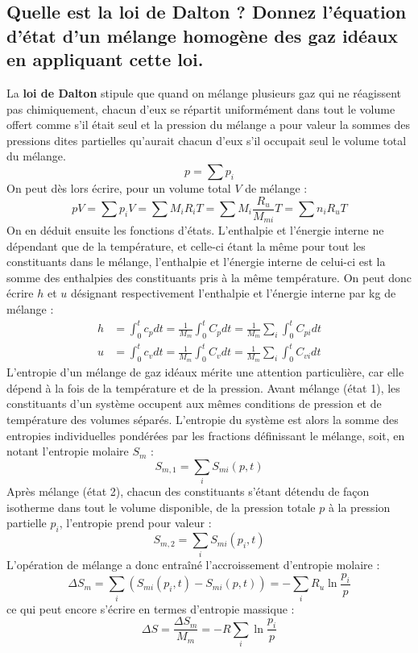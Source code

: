 \subsection{Quelle est la loi de Dalton ? Donnez l'équation d'état d'un mélange homogène des gaz idéaux en appliquant cette loi.}
La \textbf{loi de Dalton} stipule que quand on mélange plusieurs gaz qui ne réagissent pas chimiquement, chacun d'eux se répartit uniformément dans tout le volume offert comme s'il était seul et la pression du mélange a pour valeur la sommes des pressions dites partielles qu'aurait chacun d'eux s'il occupait seul le volume total du mélange.
\begin{equation} p = \sum p_i \end{equation}
On peut dès lors écrire, pour un volume total $V$ de mélange :
\begin{equation} pV = \sum p_iV = \sum M_iR_iT = \sum M_i\frac{R_u}{M_{mi}}T = \sum n_iR_uT \end{equation}
On en déduit ensuite les fonctions d'états. L'enthalpie et l'énergie interne ne dépendant que de la température, et celle-ci étant la même pour tout les constituants dans le mélange, l'enthalpie et l'énergie interne de celui-ci est la somme des enthalpies des constituants pris à la même température. On peut donc écrire $h$ et $u$ désignant respectivement l'enthalpie et l'énergie interne par \si{\kilo\gram} de mélange :
\begin{align} h &= \int_0^tc_pdt = \frac{1}{M_m}\int_0^tC_pdt = \frac{1}{M_m}\sum_i\int_0^tC_{pi}dt \\ u &= \int_0^tc_vdt = \frac{1}{M_m}\int_0^tC_vdt = \frac{1}{M_m}\sum_i\int_0^tC_{vi}dt \end{align}
L'entropie d'un mélange de gaz idéaux mérite une attention particulière, car elle dépend à la fois de la température et de la pression. Avant mélange (état 1), les constituants d'un système occupent aux mêmes conditions de pression et de température des volumes séparés. L'entropie du système est alors la somme des entropies individuelles pondérées par les fractions définissant le mélange, soit, en notant l'entropie molaire $S_m$ :
\begin{equation} S_{m,1} = \sum_iS_{mi}(p,t) \end{equation}
Après mélange (état 2), chacun des constituants s'étant détendu de façon isotherme dans tout le volume disponible, de la pression totale $p$ à la pression partielle $p_i$, l'entropie prend pour valeur :
\begin{equation} S_{m,2} = \sum_iS_{mi}(p_i,t) \end{equation}
L'opération de mélange a donc entraîné l'accroissement d'entropie molaire :
\begin{equation} \Delta S_m = \sum_i\left(S_{mi}(p_i,t) - S_{mi}(p,t)\right) = -\sum_iR_u\ln{\frac{p_i}{p}} \end{equation}
ce qui peut encore s'écrire en termes d'entropie massique :
\begin{equation} \Delta S = \frac{\Delta S_m}{M_m} = -R\sum_i\ln{\frac{p_i}{p}} \end{equation}

